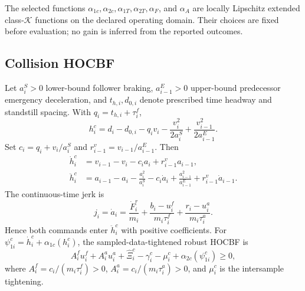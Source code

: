 The selected functions $\alpha_{1c},\alpha_{2c},\alpha_{1T},\alpha_{2T},\alpha_F$, and $\alpha_A$ are locally Lipschitz extended class-$\mathcal K$ functions on the declared operating domain. Their choices are fixed before evaluation; no gain is inferred from the reported outcomes.

\subsection{Collision HOCBF}
Let $a_i^S>0$ lower-bound follower braking, $a_{i-1}^E>0$ upper-bound predecessor emergency deceleration, and $t_{h,i},d_{0,i}$ denote prescribed time headway and standstill spacing. With $q_i=t_{h,i}+\tau_i^f$,
\begin{equation}\label{eq:hc}
h_i^c=d_i-d_{0,i}-q_iv_i-\frac{v_i^2}{2a_i^S}
+\frac{v_{i-1}^2}{2a_{i-1}^E}.
\end{equation}
Set $c_i=q_i+v_i/a_i^S$ and $r_{i-1}^v=v_{i-1}/a_{i-1}^E$. Then
\begin{align}
\dot h_i^c&=v_{i-1}-v_i-c_ia_i+r_{i-1}^va_{i-1},\label{eq:hcdot}\\
\ddot h_i^c&=a_{i-1}-a_i-\frac{a_i^2}{a_i^S}-c_i\dot a_i
+\frac{a_{i-1}^2}{a_{i-1}^E}+r_{i-1}^v\dot a_{i-1}.\label{eq:hcddot}
\end{align}
The continuous-time jerk is
\begin{equation}\label{eq:jerk}
j_i=\dot a_i=\frac{\dot F_i^r}{m_i}+\frac{b_i-u_i^f}{m_i\tau_i^f}
+\frac{r_i-u_i^a}{m_i\tau_i^a}.
\end{equation}
Hence both commands enter $\ddot h_i^c$ with positive coefficients. For $\psi_{1i}^c=\dot h_i^c+\alpha_{1c}(h_i^c)$, the sampled-data-tightened robust HOCBF is
\begin{equation}\label{eq:collision_hocbf}
A_i^fu_i^f+A_i^au_i^a+\widehat\Xi_i^c-\gamma_i^c-\mu_i^c
+\alpha_{2c}(\psi_{1i}^c)\ge0,
\end{equation}
where $A_i^f=c_i/(m_i\tau_i^f)>0$, $A_i^a=c_i/(m_i\tau_i^a)>0$, and $\mu_i^c$ is the intersample tightening.

